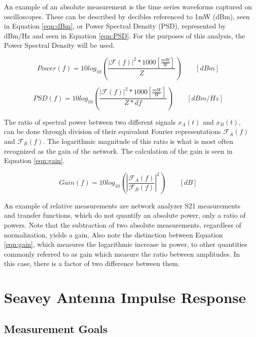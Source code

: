 	An example of an absolute measurement is the time series waveforms captured on oscilloscopes.  These can be described by decibles referenced to 1mW (dBm), seen in Equation \ref{eqn:dBm}, or Power Spectral Density (PSD), represented by dBm/Hz and seen in Equation \ref{eqn:PSD}.  For the purposes of this analysis, the Power Spectral Density will be used.
	
\begin{equation}
Power(f) = 10log_{10}(\frac{|\mathcal{F}(f)|^{2} * 1000[\frac{mW}{W}]} {Z})\qquad [dBm]
\label{eqn:dBm}
\end{equation}

	
\begin{equation}
PSD(f) = 10log_{10}(\frac{|\mathcal{F}(f)|^{2} * 1000[\frac{mW}{W}]} {Z*df})\qquad [dBm/Hz]
\label{eqn:PSD}
\end{equation}



	The ratio of spectral power between two different signals $x_{A}(t)$ and $x_{B}(t)$, can be done through division of their equivalent Fourier representations $\mathcal{F}_{A}(f)$ and $\mathcal{F}_{B}(f)$.  The logarithmic magnitude of this ratio is what is most often recognized as the gain of the network.  The calculation of the gain is seen in Equation \ref{eqn:gain}.
	
\begin{equation}
Gain(f) = 10log_{10}(|\frac{\mathcal{F}_{A}(f)}{\mathcal{F}_{B}(f)}|^{2}) \qquad [dB]
\label{eqn:gain}
\end{equation}


	An example of relative measurements are network analyzer S21 measurements and transfer functions, which do not quantify an absolute power, only a ratio of powers.  Note that the subtraction of two absolute measurements, regardless of normalization, yields a gain.  Also note the distinction between Equation \ref{eqn:gain}, which measures the logarithmic increase in power, to other quantities commonly referred to as gain which measure the ratio between amplitudes.  In this case, there is a factor of two difference between them.


\section{Seavey Antenna Impulse Response}

	\subsection{Measurement Goals}

